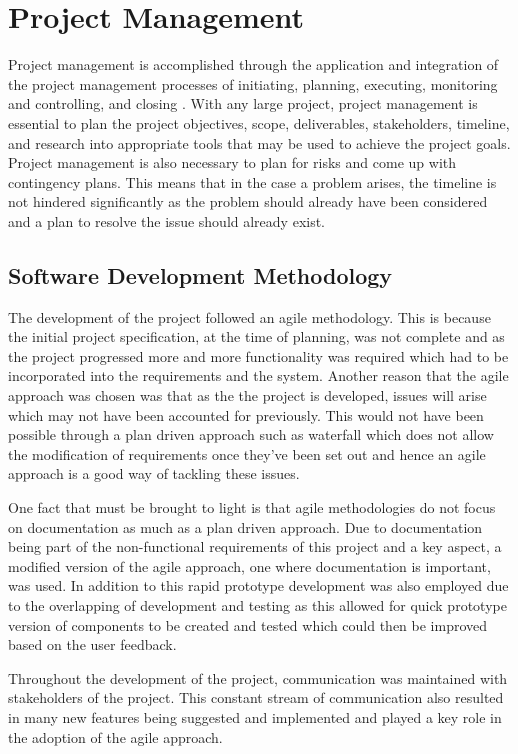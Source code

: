 \section{Project Management} \label{Section:Project_Management}
Project management is accomplished through the application and integration of the project management processes of initiating, planning, executing, monitoring and controlling, and closing \cite{PMInstitute:Book}. With any large project, project management is essential to plan the project objectives, scope, deliverables, stakeholders, timeline, and research into appropriate tools that may be used to achieve the project goals. Project management is also necessary to plan for risks and come up with contingency plans. This means that in the case a problem arises, the timeline is not hindered significantly as the problem should already have been considered and a plan to resolve the issue should already exist.

\subsection{Software Development Methodology}
The development of the project followed an agile methodology. This is because the initial project specification, at the time of planning, was not complete and as the project progressed more and more functionality was required which had to be incorporated into the requirements and the system. Another reason that the agile approach was chosen was that as the the project is developed, issues will arise which may not have been accounted for previously. This would not have been possible through a plan driven approach such as waterfall which does not allow the modification of requirements once they've been set out and hence an agile approach is a good way of tackling these issues. 

One fact that must be brought to light is that agile methodologies do not focus on documentation as much as a plan driven approach. Due to documentation being part of the non-functional requirements of this project and a key aspect, a modified version of the agile approach, one where documentation is important, was used. In addition to this rapid prototype development was also employed due to the overlapping of development and testing as this allowed for quick prototype version of components to be created and tested which could then be improved based on the user feedback.


Throughout the development of the project, communication was maintained with stakeholders of the project. This constant stream of communication also resulted in many new features being suggested and implemented and played a key role in the adoption of the agile approach.

